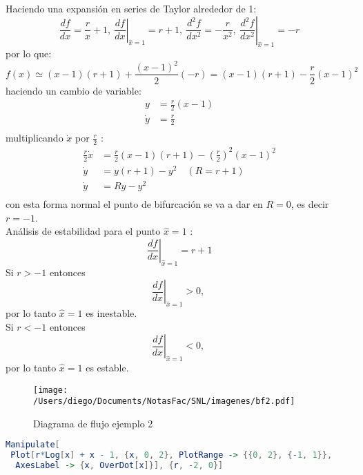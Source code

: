 Haciendo una expansión en series de Taylor alrededor de 1:
$$
\frac{df}{dx}=\frac{r}{x}+1, \ \left. \frac{df}{dx} \right|_{\hat{x}=1} = r+1, \ \frac{d^2f}{dx^2}=-\frac{r}{x^2}, \ \left. \frac{d^2f}{dx^2} \right|_{\hat{x}=1} =-r
$$
por lo que:
\begin{equation}
 f(x) \simeq (x-1)(r+1)+\frac{(x-1)^2}{2}(-r) = (x-1)(r+1)-\frac{r}{2}(x-1)^2
\end{equation}
haciendo un cambio de variable:
$$
\begin{aligned}
  y &= \frac{r}{2}(x-1) \\
  \dot{y} &= \frac{r}{2}  \\ 
\end{aligned}
$$multiplicando $ \dot{x}  $ por $\frac{r}{2}$ : 
$$
\begin{aligned}
  \frac{r}{2} \dot{x} &= \frac{r}{2}(x-1)(r+1)- \left( \frac{r}{2} \right) ^2 (x-1)^2  \\
  \dot{y} &= y(r+1)-y^2 \quad (R=r+1) \\
  \dot{y} &= Ry-y^2 \\ 
\end{aligned}
$$ con esta forma normal el punto de bifurcación se va a dar en $R=0$, es decir  $r=-1$. \\

Análisis de estabilidad para el punto $\hat{x}=1$ :
$$
\left. \frac{df}{dx} \right|_{\hat{x}=1} = r+1 
$$
Si $r>-1$ entonces
$$
\left. \frac{df}{dx} \right|_{\hat{x}=1} >0, \
$$
por lo tanto $\hat{x}=1$ es inestable. \\

Si $r<-1$ entonces
 $$
\left. \frac{df}{dx} \right|_{\hat{x}=1} < 0, \
$$
por lo tanto $\hat{x}=1$ es estable.

\begin{figure}[htpb]
  \centering
  \texttt{[image: /Users/diego/Documents/NotasFac/SNL/imagenes/bf2.pdf]}
  \caption{Diagrama de flujo ejemplo 2}
\end{figure}

\begin{lstlisting}[language=Mathematica]
Manipulate[
 Plot[r*Log[x] + x - 1, {x, 0, 2}, PlotRange -> {{0, 2}, {-1, 1}}, 
  AxesLabel -> {x, OverDot[x]}], {r, -2, 0}]
\end{lstlisting}  

